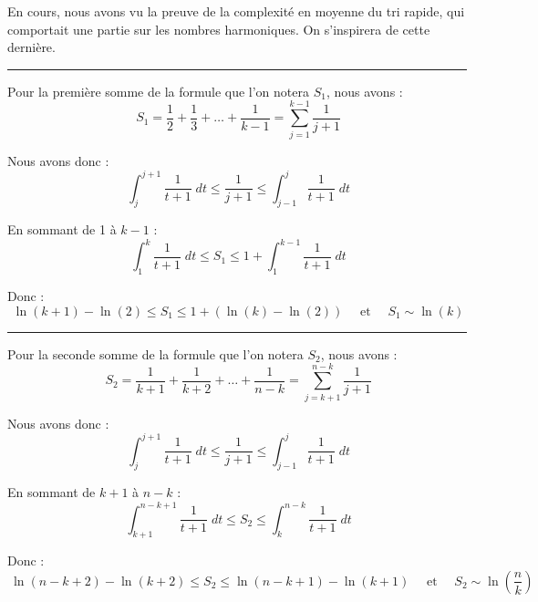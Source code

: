 \documentclass[a4paper,12pt]{report}
\begin{document}
\begin{tcolorbox}[colback=gray!10, colframe=blue!30, coltitle=black, title=Réponse à la 6.c - 2/3]

    En cours, nous avons vu la preuve de la complexité en moyenne du tri rapide, qui comportait une partie sur les nombres harmoniques. On s'inspirera de cette dernière.\\

    \vspace{0.5cm}
    \hrule
    \vspace{0.5cm}

    Pour la première somme de la formule que l'on notera \( S_1 \), nous avons :
    \[
    \ S_1 = \frac{1}{2} + \frac{1}{3} + \dots + \frac{1}{k-1} = \sum_{j = 1}^{k-1} \frac{1}{j + 1}
    \]

    \vspace{0.5cm}

    Nous avons donc :
    \[
    \ \int_{j}^{j+1} \frac{1}{t+1} \; dt \leq \frac{1}{j+1} \leq \int_{j-1}^{j} \frac{1}{t+1} \; dt
    \]

    \vspace{0.5cm}

    En sommant de 1 à \( k-1 \) :
    \[
    \ \int_{1}^{k} \frac{1}{t+1} \; dt \leq S_1 \leq 1 + \int_{1}^{k-1} \frac{1}{t+1} \; dt
    \]

    \vspace{0.5cm}

    Donc :
    \[
    \ \ln(k+1) - \ln(2) \leq S_1 \leq 1 + (\ln(k) - \ln(2)) \quad \text{ et } \quad S_1 \sim \ln(k)
    \]

    \vspace{0.5cm}
    \hrule
    \vspace{0.5cm}

    Pour la seconde somme de la formule que l'on notera \( S_2 \), nous avons :
    \[
    \ S_2 = \frac{1}{k+1} + \frac{1}{k+2} + \dots + \frac{1}{n-k} = \sum_{j = k+1}^{n-k} \frac{1}{j + 1}
    \]

    \vspace{0.5cm}

    Nous avons donc :
    \[
    \ \int_{j}^{j+1} \frac{1}{t+1} \; dt \leq \frac{1}{j+1} \leq \int_{j-1}^{j} \frac{1}{t+1} \; dt
    \]

    \vspace{0.5cm}

    En sommant de \( k+1 \) à \( n-k \) :
    \[
    \ \int_{k+1}^{n-k+1} \frac{1}{t+1} \; dt \leq S_2 \leq \int_{k}^{n-k} \frac{1}{t+1} \; dt
    \]

    \vspace{0.5cm}

    Donc :
    \[
    \ \ln(n - k + 2) - \ln(k + 2) \leq S_2 \leq \ln(n - k + 1) - \ln(k + 1) \quad \text{ et } \quad S_2 \sim \ln(\frac{n}{k})
    \]

\end{tcolorbox}
\end{document}
